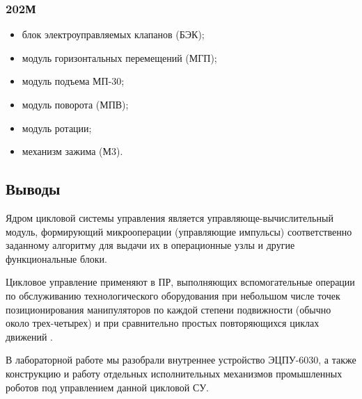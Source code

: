 \subsubsection*{202М}

\begin{itemize}
    \item блок электроуправляемых клапанов (БЭК);
    \item модуль горизонтальных перемещений (МГП);
    \item модуль подъема МП-30;
    \item модуль поворота (МПВ);
    \item модуль ротации;
    \item механизм зажима (М3).
\end{itemize}

\subsection*{Выводы}

Ядром цикловой системы управления является управляюще-вычислительный модуль, формирующий микрооперации (управляющие импульсы) соответственно заданному алгоритму для выдачи их в операционные узлы и другие функциональные блоки.

Цикловое управление применяют в ПР, выполняющих вспомогательные операции по обслуживанию технологического оборудования при небольшом числе точек позиционирования манипуляторов по каждой степени подвижности (обычно около трех-четырех) и при сравнительно простых повторяющихся циклах движений \cite{oil:cycle}.

В лабораторной работе мы разобрали внутреннее устройство ЭЦПУ-6030, а также конструкцию и работу отдельных исполнительных механизмов промышленных роботов под управлением данной цикловой СУ.



\clearpage

